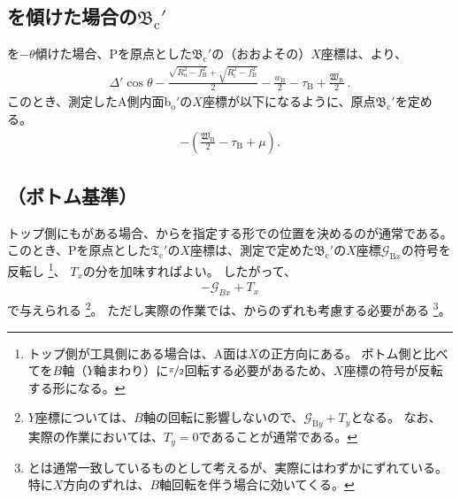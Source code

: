 \subsection[\Table を傾けた場合の\texorpdfstring{$\mathfrak B_\mathrm c'$}{Bc'}]
           {\Table を傾けた場合の$\boldsymbol{\mathfrak B_\mathrm c'}$}
\Table を$-\theta$傾けた場合、\TableCenter Pを原点とした\BottomOutcutCenter$\mathfrak B_\mathrm c'$の（おおよその）$X$座標は、より、
\begin{align}
  \label{eq:gaisakucenterBt}
  \Delta'\cos\theta-\frac{\sqrt{R_\mathrm o^2-f_\mathrm B^2}+\sqrt{R_\mathrm i^2-f_\mathrm B^2}}2
  -\frac{w_\mathrm B}2-\tau_\mathrm B+\frac{\mathfrak W_\mathrm B}2\ .
\end{align}
このとき、測定したA側内面b$_\mathrm o'$の$X$座標が以下になるように、原点$\mathfrak B_\mathrm c'$を定める。
\begin{align}
  \label{eq:gaisakucenterBr}
  -\left(\frac{\mathfrak W_\mathrm B}2-\tau_\mathrm B+\mu\right).
\end{align}


\subsection{\TopOutcutCenter（ボトム基準）}
\expandafterindex{\yomiTopOutcut@\nameTopOutcut}トップ側にも\nameOutcut がある場合、\BottomOutcutCenter から\CenterlineEndFaceDif を指定する形で\TopOutcutCenter の位置を決めるのが通常である。
このとき、\TableCenter Pを原点とした\TopOutcutCenter$\mathfrak T_\mathrm c'$の$X$座標は、測定で定めた$\mathfrak B_\mathrm c'$の$X$座標$\mathcal G_{\mathrm Bx}$の符号を反転し
\footnote{トップ側が工具側にある場合は、A面は$X$の正方向にある。
ボトム側と比べて\Table を$B$軸（$Y$軸まわり）に$\nicefrac\pi2$回転する必要があるため、$X$座標の符号が反転する形になる。}、
\CenterlineEndFaceDifAC$T_x$の分を加味すればよい。
したがって、
\begin{align}
  \label{eq:BbasedTx}
  -\mathcal G_{Bx}+T_x
\end{align}
で与えられる
\footnote{$Y$座標については、$B$軸の回転に影響しないので、$\mathcal G_{\mathrm By}+T_y$となる。
なお、実際の作業においては、$T_y = 0$であることが通常である。}。
ただし実際の作業では、\TableCenter からのずれも考慮する必要がある
\footnote{\TableCenter と\JigCenter は通常一致しているものとして考えるが、実際にはわずかにずれている。
特に$X$方向のずれは、$B$軸回転を伴う場合に効いてくる。}。



